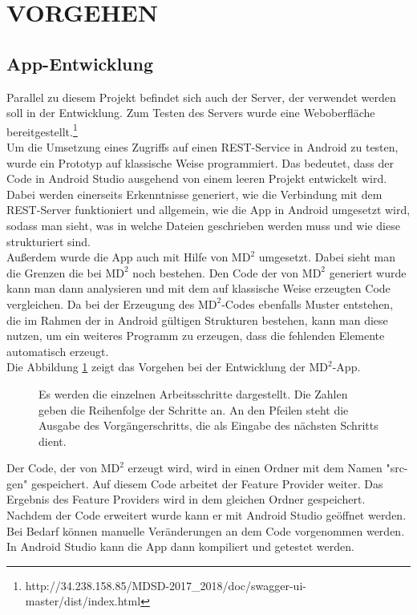 \section{\uppercase{Vorgehen}}

\subsection{App-Entwicklung}

\noindent Parallel zu diesem Projekt befindet sich auch der Server, der verwendet werden soll in der Entwicklung. Zum Testen des Servers wurde eine Web\-ober\-fl\"ache bereitgestellt.\footnote{http://34.238.158.85/MDSD-2017\_2018/doc/swagger-ui-master/dist/index.html} \\
Um die Umsetzung eines Zugriffs auf einen REST-Service in Android zu testen, wurde ein Prototyp auf klassische Weise programmiert. Das bedeutet, dass der Code in Android Studio ausgehend von einem leeren Projekt entwickelt wird. Dabei werden einerseits Erkenntnisse generiert, wie die Verbindung mit dem REST-Server funktioniert und allgemein, wie die App in Android umgesetzt wird, sodass man sieht, was in welche Dateien geschrieben werden muss und wie diese strukturiert sind.\\
Au\ss{}erdem wurde die App auch mit Hilfe von $\text{MD}^2$ umgesetzt. Dabei sieht man die Grenzen die bei $\text{MD}^2$ noch bestehen. Den Code der von $\text{MD}^2$ generiert wurde kann man dann analysieren und mit dem auf klassische Weise erzeugten Code vergleichen. Da bei der Erzeugung des $\text{MD}^2$-Codes ebenfalls Muster entstehen, die im Rahmen der in Android g\"ultigen Strukturen bestehen, kann man diese nutzen, um ein weiteres Programm zu erzeugen, dass die fehlenden Elemente automatisch erzeugt.\\
Die Abbildung \ref{fig:Arbeitsschritte} zeigt das Vorgehen bei der Entwicklung der $\text{MD}^2$-App.

\begin{figure}[!h]
	\centering
	{}
	\caption{Es werden die einzelnen Arbeitsschritte dargestellt. Die Zahlen geben die Reihenfolge der Schritte an. An den Pfeilen steht die Ausgabe des Vorg\"angerschritts, die als Eingabe des n\"achsten Schritts dient.}
	\label{fig:Arbeitsschritte}
\end{figure}

\noindent Der Code, der von $\text{MD}^2$ erzeugt wird, wird in einen Ordner mit dem Namen "src-gen" gespeichert. Auf diesem Code arbeitet der Feature Provider weiter. Das Ergebnis des Feature Providers wird in dem gleichen Ordner gespeichert. Nachdem der Code erweitert wurde kann er mit Android Studio ge\"offnet werden. Bei Bedarf k\"onnen manuelle Ver\"anderungen an dem Code vorgenommen werden. In Android Studio kann die App dann kompiliert und getestet werden.

